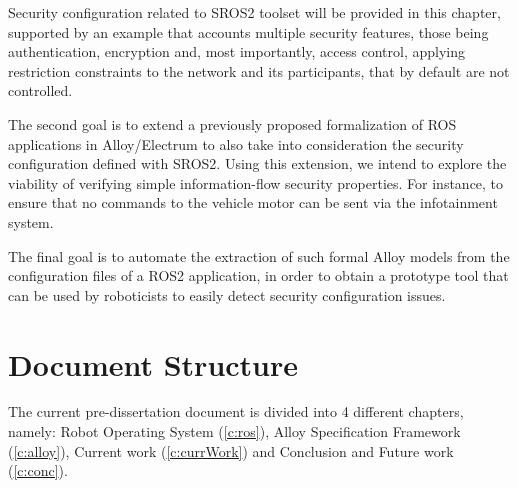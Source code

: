 Security configuration related to SROS2 toolset will be provided in this chapter, supported by an example that accounts multiple security features, those being authentication, encryption and, most importantly, access control, applying restriction constraints to the network and its participants, that by default are not controlled.

The second goal is to extend a previously proposed\cite{9341085} formalization of ROS applications in Alloy/Electrum\cite{alloy-DJ, lwspecification} to also take into consideration the security configuration defined with SROS2. Using this extension, we intend to explore the viability of verifying simple information-flow security properties. For instance, to ensure that no commands to the vehicle motor can be sent via the infotainment system.

The final goal is to automate the extraction of such formal Alloy models from the configuration files of a ROS2 application, in order to obtain a prototype tool that can be used by roboticists to easily detect security configuration issues.

\section{Document Structure}

The current pre-dissertation document is divided into 4 different chapters, namely: Robot Operating System (\ref{c:ros}), Alloy Specification Framework (\ref{c:alloy}), Current work (\ref{c:currWork}) and Conclusion and Future work (\ref{c:conc}).